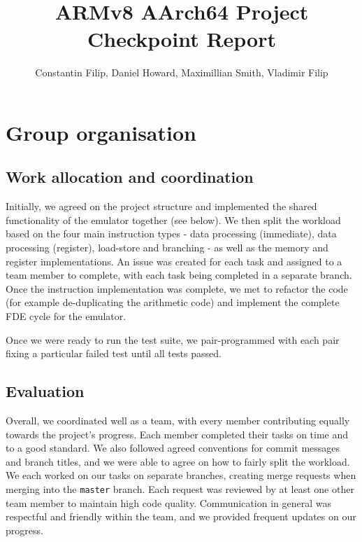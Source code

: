 \documentclass[11pt]{article}
\begin{document}
\title{ARMv8 AArch64 Project Checkpoint Report}
\author{Constantin Filip, Daniel Howard, Maximillian Smith, Vladimir Filip}

\maketitle

\section{Group organisation}

\subsection{Work allocation and coordination}

Initially, we agreed on the project structure and implemented the shared functionality of the emulator together (see below). We then split the workload based on the four main instruction types - data processing (immediate), data processing (register), load-store and branching - as well as the memory and register implementations. An issue was created for each task and assigned to a team member to complete, with each task being completed in a separate branch. Once the instruction implementation was complete, we met to refactor the code (for example de-duplicating the arithmetic code) and implement the complete FDE cycle for the emulator.

Once we were ready to run the test suite, we pair-programmed with each pair fixing a particular failed test until all tests passed.

\subsection{Evaluation}

Overall, we coordinated well as a team, with every member contributing equally towards the project's progress. Each member completed their tasks on time and to a good standard. We also followed agreed conventions for commit messages and branch titles, and we were able to agree on how to fairly split the workload. We each worked on our tasks on separate branches, creating merge requests when merging into the \texttt{master} branch. Each request was reviewed by at least one other team member to maintain high code quality. Communication in general was respectful and friendly within the team, and we provided frequent updates on our progress.
\end{document}
